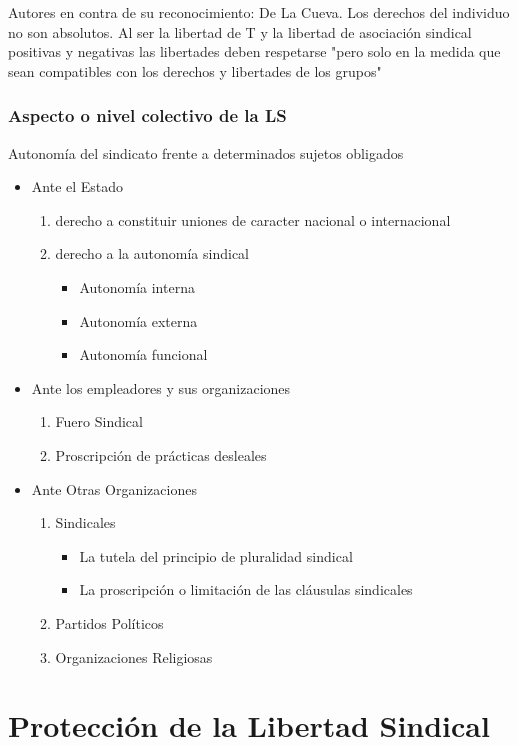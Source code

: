 \documentclass[spanish,12pt,a4paper,titlepage]{report}
\begin{document}
Autores en contra de su reconocimiento: De La Cueva. Los derechos del individuo no son absolutos. Al ser la libertad de T y la libertad de asociación sindical positivas y negativas las libertades deben respetarse "pero solo en la medida que sean compatibles con los derechos y libertades de los grupos"

\subsection{Aspecto o nivel colectivo de la LS}
Autonomía del sindicato frente a determinados sujetos obligados

\begin{itemize}
\item Ante el Estado
	\begin{enumerate}
	\item derecho a constituir uniones de caracter nacional o internacional
	\item derecho a la autonomía sindical
		\begin{itemize}
		\item Autonomía interna
		\item Autonomía externa
		\item Autonomía funcional
		\end{itemize}
	\end{enumerate}
\item Ante los empleadores y sus organizaciones
	\begin{enumerate}
	\item Fuero Sindical
	\item Proscripción de prácticas desleales
	\end{enumerate}	
\item Ante Otras Organizaciones
	\begin{enumerate}
	\item Sindicales
		\begin{itemize}
		\item  La tutela del principio de pluralidad sindical
		\item  La proscripción o limitación de las cláusulas sindicales
		\end{itemize}
	\item Partidos Políticos
	\item Organizaciones Religiosas		
	\end{enumerate}
\end{itemize}


\chapter{Protección de la Libertad Sindical}
\end{document}
